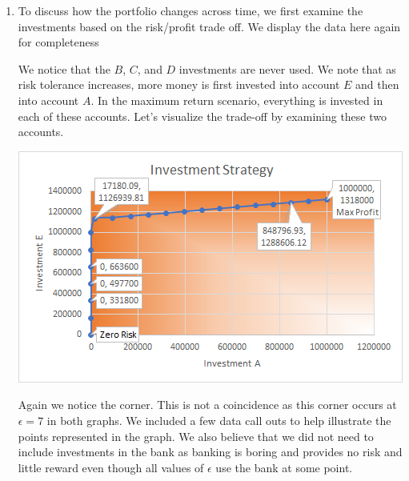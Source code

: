 \documentclass[11pt]{article}
\begin{document}
\begin{enumerate}
\begin{enumerate}
\item To discuss how the portfolio changes across time, we first examine the investments based on the risk/profit trade off.  We display the data here again for completeness


{\tiny {}}

We notice that the $B$, $C$, and $D$ investments are never used.  We note that as risk tolerance increases, more money is first invested into account $E$ and then into account $A$.  In the maximum return scenario, everything is invested in each of these accounts.  Let's visualize the trade-off by examining these two accounts.

  \includegraphics[width = .9\textwidth]{output1c.png}

Again we notice the corner.  This is not a coincidence as this corner occurs at $\epsilon = 7$ in both graphs.  We included a few data call outs to help illustrate the points represented in the graph.  We also believe that we did not need to include investments in the bank as banking is boring and provides no risk and little reward even though all values of $\epsilon$ use the bank at some point.
\end{enumerate}
\end{enumerate}
\end{document}
